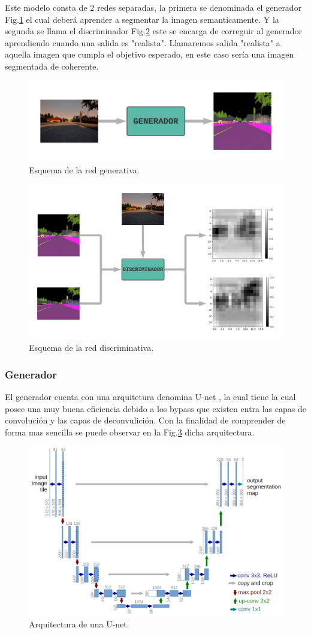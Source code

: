\documentclass[]{IEEEtran}
\begin{document}
    Este modelo consta de $2$ redes separadas, la primera se denominada el generador Fig.\ref{fig:generator}
    el cual deberá aprender a segmentar la imagen semanticamente. Y la segunda se llama el discriminador Fig.\ref{fig:discr}
    este se encarga de correguir al generador aprendiendo cuando una salida es "realista". 
    Llamaremos salida "realista" a aquella imagen que cumpla el objetivo esperado, en este caso sería una imagen segmentada 
    de coherente.
    
    \begin{figure}
        \centering
        \includegraphics[width=.4\textwidth]{Imgs/Generador.png}
        \caption{Esquema de la red generativa.}
        \label{fig:generator}
    \end{figure}

    \begin{figure}
        \centering
        \includegraphics[width=.4\textwidth]{Imgs/Discriminador.png}
        \caption{Esquema de la red discriminativa.}
        \label{fig:discr}
    \end{figure}
    


    \subsubsection{Generador}

    El generador cuenta con una arquitetura denomina U-net \cite{U-Net}, la cual tiene 
    la cual posee una muy buena eficiencia debido a los bypass que existen entra las capas de convolución y 
    las capas de deconvulición. Con la finalidad de comprender de forma mas sencilla se puede observar 
    en la Fig.\ref{fig:u-net} dicha arquitectura.

    \begin{figure}
        \centering
        \includegraphics[width=.4\textwidth]{Imgs/u-net-architecture.png}
        \caption{Arquitectura de una U-net.}
        \label{fig:u-net}
    \end{figure}
\end{document}
